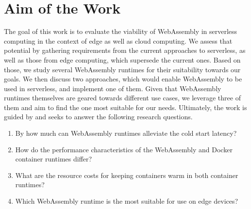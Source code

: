 

\section{Aim of the Work}


The goal of this work is to evaluate the viability of WebAssembly in serverless computing in the context of edge as well as cloud computing. We assess that potential by gathering requirements from the current approaches to serverless, as well as those from edge computing, which supersede the current ones. Based on those, we study several WebAssembly runtimes for their suitability towards our goals. We then discuss two approaches, which would enable WebAssembly to be used in serverless, and implement one of them. Given that WebAssembly runtimes themselves are geared towards different use cases, we leverage three of them and aim to find the one most suitable for our needs. Ultimately, the work is guided by and seeks to answer the following research questions.

\begin{enumerate}
  \item By how much can WebAssembly runtimes alleviate the cold start latency? 

  \item How do the performance characteristics of the WebAssembly and Docker container runtimes differ?

  \item What are the resource costs for keeping containers warm in both container runtimes?

  \item Which WebAssembly runtime is the most suitable for use on edge devices?
\end{enumerate}

